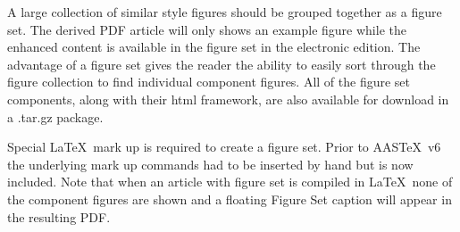 \documentclass[preprint]{aastex62}
\newcommand\aastex{AAS\TeX}
\newcommand\latex{La\TeX}
\begin{document}
A large collection of similar style figures should be grouped together as a
figure set.  The derived PDF article will only shows an example figure
while the enhanced content is available in the figure set in the electronic
edition.  The advantage of a figure set gives the reader the ability to
easily sort through the figure collection to find individual component
figures.  All of the figure set components, along with their html framework,
are also available for download in a .tar.gz package.

Special \latex\ mark up is required to create a figure set.  Prior to
\aastex\ v6 the underlying mark up commands had to be inserted by hand
but is now included.  Note that when an article with figure set is compiled
in \latex\ none of the component figures are shown and a floating Figure
Set caption will appear in the resulting PDF.

\figsetstart
{}

\figsetgrpstart
{}
\figsetgrpend

\figsetgrpstart
{}
\figsetgrpend

\figsetgrpstart
{}
\figsetgrpend

\figsetgrpstart
{}
\figsetgrpend

\figsetgrpstart
{}
\figsetgrpend

\figsetgrpstart
{}
\figsetgrpend

\figsetgrpstart
{}
\figsetgrpend
\end{document}
